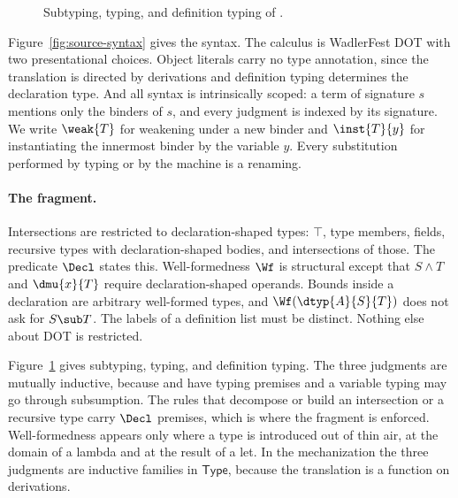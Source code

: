 \begin{figure}
\caption{Subtyping, typing, and definition typing of \DOTMNF.}
\label{fig:source-typing}
\end{figure}

Figure~\ref{fig:source-syntax} gives the syntax. The calculus is WadlerFest DOT \cite{amin2016essence} with two presentational choices. Object literals carry no type annotation, since the translation is directed by derivations and definition typing determines the declaration type. And all syntax is intrinsically scoped: a term of signature $s$ mentions only the binders of $s$, and every judgment is indexed by its signature. We write $\weak{T}$ for weakening under a new binder and $\inst{T}{y}$ for instantiating the innermost binder by the variable $y$. Every substitution performed by typing or by the machine is a renaming.

\paragraph{The fragment.}
Intersections are restricted to declaration-shaped types: $\top$, type members, fields, recursive types with declaration-shaped bodies, and intersections of those. The predicate $\Decl$ states this. Well-formedness $\Wf$ is structural except that $S \wedge T$ and $\dmu{x}{T}$ require declaration-shaped operands. Bounds inside a declaration are arbitrary well-formed types, and $\Wf(\dtyp{A}{S}{T})$ does not ask for $S \sub T$. The labels of a definition list must be distinct. Nothing else about DOT is restricted.

Figure~\ref{fig:source-typing} gives subtyping, typing, and definition typing. The three judgments are mutually inductive, because  and  have typing premises and a variable typing may go through subsumption. The rules that decompose or build an intersection or a recursive type carry $\Decl$ premises, which is where the fragment is enforced. Well-formedness appears only where a type is introduced out of thin air, at the domain of a lambda and at the result of a let. In the mechanization the three judgments are inductive families in $\mathsf{Type}$, because the translation is a function on derivations.

